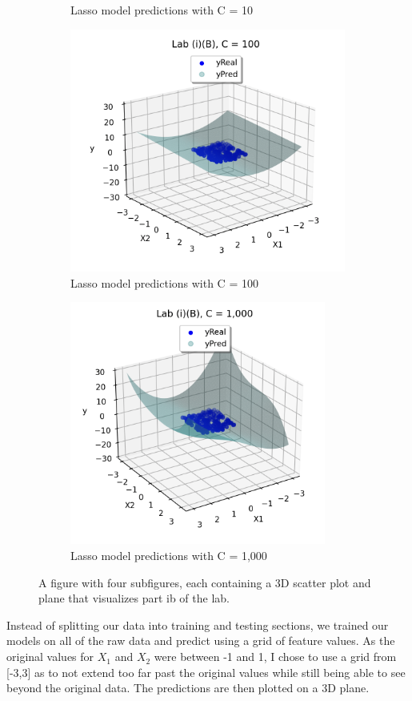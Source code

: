 \documentclass{article}
\begin{document}
\begin{figure}
\begin{subfigure}{.5\textwidth}
  \caption{Lasso model predictions with C = 10}
  \label{fig:sub2}
\end{subfigure}
\label{fig:test}
\begin{subfigure}{.5\linewidth}
  \centering
  \includegraphics[width=\linewidth, height=8cm]{ib3.png}
  \caption{Lasso model predictions with C = 100}
  \label{fig:sub3}
\end{subfigure}%
\begin{subfigure}{.5\textwidth}
  \centering
  \includegraphics[width=\linewidth, height=8cm]{ib4.png}
  \caption{Lasso model predictions with C = 1,000}
  \label{fig:sub4}
\end{subfigure}
\caption{A figure with four subfigures, each containing a 3D scatter plot and plane that visualizes part ib of the lab. }
\label{fig:test}
\end{figure}

Instead of splitting our data into training and testing sections, we trained our models on all of the raw data and predict using a grid of feature values. As the original values for $X_1$ and $X_2$ were between -1 and 1, I chose to use a grid from [-3,3] as to not extend too far past the original values while still being able to see beyond the original data. The predictions are then plotted on a 3D plane.
\end{document}
